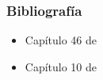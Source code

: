 \begin{frame}
	\frametitle{Bibliografía}
    
    \begin{itemize}
        \item Capítulo 46 de \cite{siciliano2016handbook}
        \item Capítulo 10 de \cite{thrun2005probabilistic}
    \end{itemize}    

    \nocite{grisetti2010tutorial}
    \nocite{chebrolu2021adaptive}

	
	\printbibliography
	
\end{frame}
